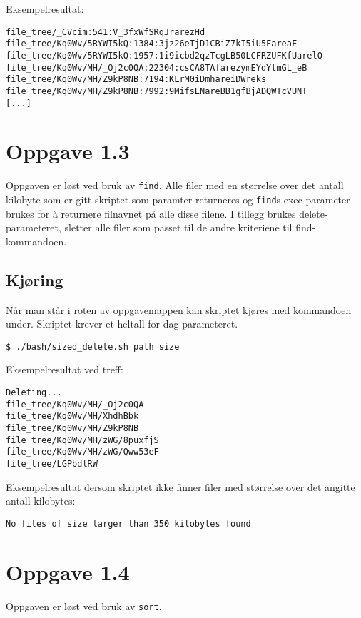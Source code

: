 \documentclass{article}
\begin{document}
Eksempelresultat:
\begin{Verbatim}[fontsize=\small, frame=single]
file_tree/_CVcim:541:V_3fxWfSRqJrarezHd
file_tree/Kq0Wv/5RYWI5kQ:1384:3jz26eTjD1CBiZ7kI5iU5FareaF
file_tree/Kq0Wv/5RYWI5kQ:1957:1i9icbd2qzTcgLB50LCFRZUFKfUarelQ
file_tree/Kq0Wv/MH/_Oj2c0QA:22304:csCA8TAfarezymEYdYtmGL_eB
file_tree/Kq0Wv/MH/Z9kP8NB:7194:KLrM0iDmhareiDWreks
file_tree/Kq0Wv/MH/Z9kP8NB:7992:9MifsLNareBB1gfBjADQWTcVUNT
[...]
\end{Verbatim}

\section*{Oppgave 1.3}

Oppgaven er løst ved bruk av \verb;find;. Alle filer med en størrelse over det antall kilobyte som er gitt skriptet som paramter returneres og \verb;find;s exec-parameter brukes for å returnere filnavnet på alle disse filene. I tillegg brukes delete-parameteret, sletter alle filer som passet til de andre kriteriene til find-kommandoen.

\subsection*{Kjøring}
Når man står i roten av oppgavemappen kan skriptet kjøres med kommandoen under. Skriptet krever et heltall for dag-parameteret.
\begin{Verbatim}[fontsize=\small, frame=single]
$ ./bash/sized_delete.sh path size
\end{Verbatim}

Eksempelresultat ved treff:
\begin{Verbatim}[fontsize=\small, frame=single]
Deleting...
file_tree/Kq0Wv/MH/_Oj2c0QA
file_tree/Kq0Wv/MH/XhdhBbk
file_tree/Kq0Wv/MH/Z9kP8NB
file_tree/Kq0Wv/MH/zWG/8puxfjS
file_tree/Kq0Wv/MH/zWG/Qww53eF
file_tree/LGPbdlRW
\end{Verbatim}
Eksempelresultat dersom skriptet ikke finner filer med størrelse over det angitte antall kilobytes:
\begin{Verbatim}[fontsize=\small, frame=single]
No files of size larger than 350 kilobytes found
\end{Verbatim}

\section*{Oppgave 1.4}

Oppgaven er løst ved bruk av \verb;sort;.
\end{document}
